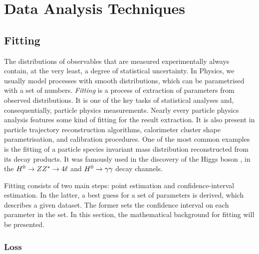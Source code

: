 \chapter{Data Analysis Techniques}

\section{Fitting}

The distributions of observables that are measured experimentally always contain, at the very least, a degree of statistical uncertainty.
In Physics, we usually model processes with smooth distributions, which can be parametrised with a set of numbers. 
\textit{Fitting} is a process of extraction of parameters from observed distributions. 
It is one of the key tasks of statistical analyses and, consequentially, particle physics measurements. 
Nearly every particle physics analysis features some kind of fitting for the result extraction. 
It is also present in particle trajectory reconstruction algorithms, calorimeter cluster shape parametrisation, and calibration procedures.
One of the most common examples is the fitting of a particle species invariant mass distribution reconstructed from its decay products.
It was famously used in the discovery of the Higgs boson \cite{ATLAS:2012yve,CMS:2012qbp}, in the  $H^0\rightarrow ZZ^{*}\rightarrow 4\ell$ and $H^0\rightarrow\gamma\gamma$ decay channels.

Fitting consists of two main steps: point estimation and confidence-interval estimation. 
In the latter, a best guess for a set of parameters is derived, which describes a given dataset.
The former sets the confidence interval on each parameter in the set. 
In this section, the mathematical background for fitting will be presented.

\subsection{Loss}

